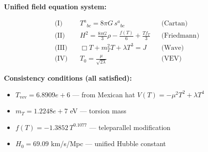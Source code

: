 
\textbf{Unified field equation system:}

\begin{align}
  \text{(I)} \quad & T^a{}_{bc} = 8\pi G \, s^a{}_{bc} && \text{(Cartan)} \\
  \text{(II)} \quad & H^2 = \frac{8\pi G}{3}\rho - \frac{f(T)}{6} + \frac{Tf_T}{3} && \text{(Friedmann)} \\
  \text{(III)} \quad & \Box T + m_T^2 T + \lambda T^3 = J && \text{(Wave)} \\
  \text{(IV)} \quad & T_0 = \frac{\mu}{\sqrt{2\lambda}} && \text{(VEV)}
\end{align}

\textbf{Consistency conditions (all satisfied):}
\begin{itemize}
  \item $T_{\text{vev}} = 6.8909e+6$ — from Mexican hat $V(T) = -\mu^2 T^2 + \lambda T^4$
  \item $m_T = 1.2248e+7$ eV — torsion mass
  \item $f(T) = -1.3852 \, T^{0.1077}$ — teleparallel modification
  \item $H_0 = 69.09$ km/s/Mpc — unified Hubble constant
\end{itemize}